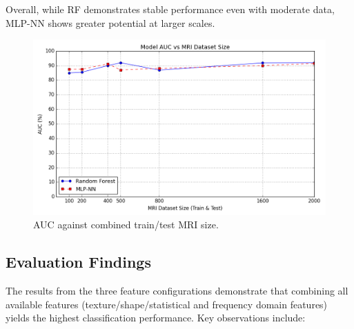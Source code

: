 \documentclass[11pt,a4paper]{article}
\begin{document}
		Overall, while RF demonstrates stable performance even with moderate data, 
		MLP-NN shows greater potential at larger scales.

		\begin{figure}[H]
			\centering
			\includegraphics[width=1.0\textwidth]{images/auc_vs_mri_size.png}
			\caption{AUC against combined train/test MRI size.}
			\label{fig1:}
		\end{figure}		



	
	




\subsection{Evaluation Findings}

The results from the three feature configurations demonstrate that combining all available 
features (texture/shape/statistical and frequency domain features) yields the highest 
classification performance. Key observations include:
\end{document}
